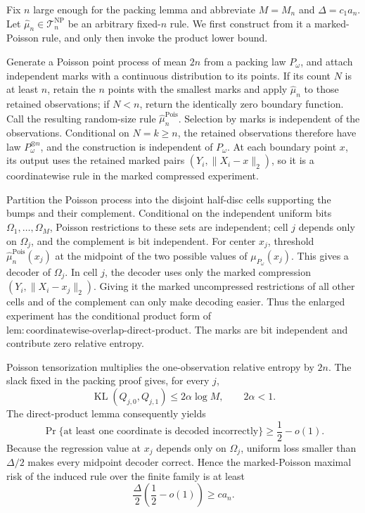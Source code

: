 Fix \(n\) large enough for the packing lemma and abbreviate \(M=M_n\) and \(\Delta=c_1a_n\).  Let \(\widehat\mu_n\in\mathcal T_n^{\mathrm{NP}}\) be an arbitrary fixed-\(n\) rule.  We first construct from it a marked-Poisson rule, and only then invoke the product lower bound.

Generate a Poisson point process of mean \(2n\) from a packing law \(P_\omega\), and attach independent marks with a continuous distribution to its points.  If its count \(N\) is at least \(n\), retain the \(n\) points with the smallest marks and apply \(\widehat\mu_n\) to those retained observations; if \(N<n\), return the identically zero boundary function.  Call the resulting random-size rule \(\widehat\mu_n^{\mathrm{Pois}}\).  Selection by marks is independent of the observations.  Conditional on \(N=k\geq n\), the retained observations therefore have law \(P_\omega^{\otimes n}\), and the construction is independent of \(P_\omega\).  At each boundary point \(x\), its output uses the retained marked pairs \((Y_i,\lVert X_i-x\rVert_2)\), so it is a coordinatewise rule in the marked compressed experiment.

Partition the Poisson process into the disjoint half-disc cells supporting the bumps and their complement.  Conditional on the independent uniform bits \(\Omega_1,\ldots,\Omega_M\), Poisson restrictions to these sets are independent; cell \(j\) depends only on \(\Omega_j\), and the complement is bit independent.  For center \(x_j\), threshold \(\widehat\mu_n^{\mathrm{Pois}}(x_j)\) at the midpoint of the two possible values of \(\mu_{P_\omega}(x_j)\).  This gives a decoder of \(\Omega_j\).  In cell \(j\), the decoder uses only the marked compression \((Y_i,\lVert X_i-x_j\rVert_2)\).  Giving it the marked uncompressed restrictions of all other cells and of the complement can only make decoding easier.  Thus the enlarged experiment has the conditional product form of \(\mathrm{lem:coordinatewise\text{-}overlap\text{-}direct\text{-}product}\).  The marks are bit independent and contribute zero relative entropy.

Poisson tensorization multiplies the one-observation relative entropy by \(2n\).  The slack fixed in the packing proof gives, for every \(j\),
\[
 \operatorname{KL}(Q_{j,0},Q_{j,1})
 \leq 2\alpha\log M,
 \qquad 2\alpha<1.
\]
The direct-product lemma consequently yields
\[
 \Pr\{\text{at least one coordinate is decoded incorrectly}\}
 \geq\frac12-o(1).
\]
Because the regression value at \(x_j\) depends only on \(\Omega_j\), uniform loss smaller than \(\Delta/2\) makes every midpoint decoder correct.  Hence the marked-Poisson maximal risk of the induced rule over the finite family is at least
\[
 \frac{\Delta}{2}\left(\frac12-o(1)\right)\geq c a_n.
\]

